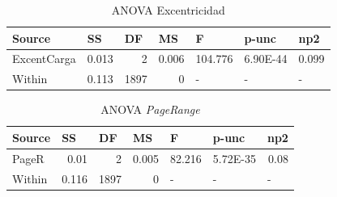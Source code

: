 \documentclass{article}
\begin{document}
\begin{table}[htbp]
  \centering
  \caption{ANOVA Excentricidad}
    \begin{tabular}{lrrrlll}
    \textbf{Source} & \multicolumn{1}{l}{\textbf{SS}} & \multicolumn{1}{l}{\textbf{DF}} & \multicolumn{1}{l}{\textbf{MS}} & \textbf{F} & \textbf{p-unc} & \textbf{np2} \\
    \midrule
    ExcentCarga & 0.013 & 2     & 0.006 & \multicolumn{1}{r}{104.776} & \multicolumn{1}{r}{6.90E-44} & \multicolumn{1}{r}{0.099} \\
    Within & 0.113 & 1897  & 0     & -     & -     & - \\
    \bottomrule
    \end{tabular}%
  \label{tab:addlabel}%
\end{table}%

\begin{table}[htbp]
  \centering
  \caption{ANOVA \textit{PageRange}}
    \begin{tabular}{lrrrlll}
    \textbf{Source} & \multicolumn{1}{l}{\textbf{SS}} & \multicolumn{1}{l}{\textbf{DF}} & \multicolumn{1}{l}{\textbf{MS}} & \textbf{F} & \textbf{p-unc} & \textbf{np2} \\
    \midrule
    PageR & 0.01  & 2     & 0.005 & \multicolumn{1}{r}{82.216} & \multicolumn{1}{r}{5.72E-35} & \multicolumn{1}{r}{0.08} \\
    Within & 0.116 & 1897  & 0     & -     & -     & - \\
    \bottomrule
    \end{tabular}%
  \label{tab:addlabel}%
\end{table}%
\end{document}
